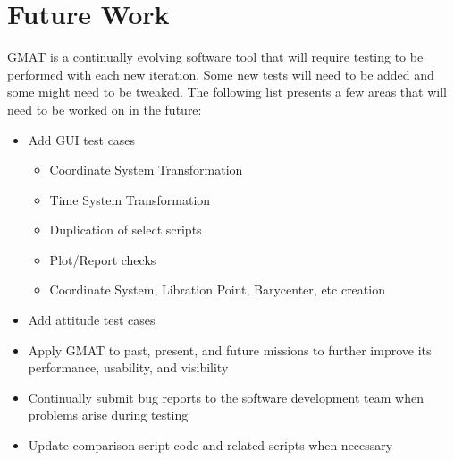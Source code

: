 \chapter{Future Work}
\label{Ch:FutureWork}

GMAT is a continually evolving software tool that will require
testing to be performed with each new iteration. Some new tests will
need to be added and some might need to be tweaked. The following
list presents a few areas that will need to be worked on in the
future:\\

\begin{itemize}
    \item{Add GUI test cases}
    \begin{itemize}
        \item{Coordinate System Transformation}
        \item{Time System Transformation}
        \item{Duplication of select scripts}
        \item{Plot/Report checks}
        \item{Coordinate System, Libration Point, Barycenter, etc
        creation}
    \end{itemize}
    \item{Add attitude test cases}
    \item{Apply GMAT to past, present, and future missions to further improve its performance, usability, and visibility}
    \item{Continually submit bug reports to the software development
    team when problems arise during testing}
    \item{Update comparison script code and related scripts when necessary}
\end{itemize}
